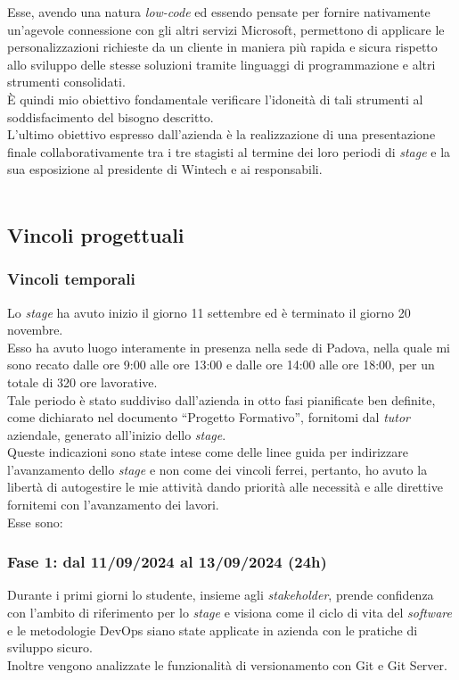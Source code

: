 Esse, avendo una natura \emph{low-code} ed essendo pensate per fornire nativamente un'agevole connessione con gli altri servizi Microsoft, permettono di applicare le personalizzazioni richieste da un cliente in maniera più rapida e sicura rispetto allo sviluppo delle stesse soluzioni tramite linguaggi di programmazione e altri strumenti consolidati.\\
È quindi mio obiettivo fondamentale verificare l'idoneità di tali strumenti al soddisfacimento del bisogno descritto.\\
L'ultimo obiettivo espresso dall'azienda è la realizzazione di una presentazione finale collaborativamente tra i tre stagisti al termine dei loro periodi di \emph{stage} e la sua esposizione al presidente di Wintech e ai responsabili.\\\\

\subsection{Vincoli progettuali}
\subsubsection*{Vincoli temporali}
Lo \emph{stage} ha avuto inizio il giorno 11 settembre ed è terminato il giorno 20 novembre.\\
Esso ha avuto luogo interamente in presenza nella sede di Padova, nella quale mi sono recato dalle ore 9:00 alle ore 13:00 e dalle ore 14:00 alle ore 18:00, per un totale di 320 ore lavorative.\\
Tale periodo è stato suddiviso dall'azienda in otto fasi pianificate ben definite, come dichiarato nel documento “Progetto Formativo”, fornitomi dal \emph{tutor} aziendale, generato all'inizio dello \emph{stage}.\\
Queste indicazioni sono state intese come delle linee guida per indirizzare l'avanzamento dello \emph{stage} e non come dei vincoli ferrei, pertanto, ho avuto la libertà di autogestire le mie attività dando priorità alle necessità e alle direttive fornitemi con l'avanzamento dei lavori.\\
Esse sono:
\subsubsection*{Fase 1: dal 11/09/2024 al 13/09/2024 (24h)}
Durante i primi giorni lo studente, insieme agli \emph{stakeholder}, prende confidenza con l'ambito di riferimento per lo \emph{stage} e visiona come il ciclo di vita del \emph{software} e le metodologie \gls{DevOps} siano state applicate in azienda con le pratiche di sviluppo sicuro.\\
Inoltre vengono analizzate le funzionalità di versionamento con Git e Git Server.

